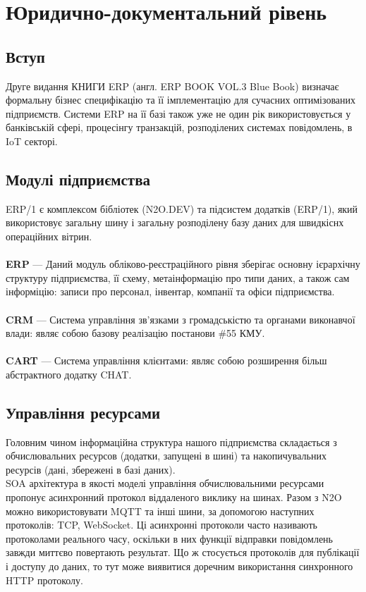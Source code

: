 \chapter{Юридично-документальний рівень}

\section{Вступ}

Друге видання КНИГИ ERP (англ. ERP BOOK VOL.3 Blue Book) визначає формальну
бізнес специфікацію та її імплементацію для сучасних оптимізованих підприємств.
Системи ERP на її базі також уже не один рік використовується у банківській сфері,
процесінгу транзакцій, розподілених системах повідомлень, в IoT секторі.

\section{Модулі підприємства}

ERP/1 є комплексом бібліотек (N2O.DEV) та підсистем додатків (ERP/1),
який використовує загальну шину і загальну розподілену базу даних для швидкіснх операційних вітрин.
\\
\\
\textbf{ERP} — Даний модуль обліково-реєстраційного рівня зберігає основну ієрархічну структуру
        підприємства, її схему, метаінформацію про типи даних, а також сам інформіцію:
        записи про персонал, інвентар, компанії та офіси підприємства.
\\
\\
\textbf{CRM} — Система управління зв'язками з громадськістю та органами виконавчої влади:
        являє собою базову реалізацію постанови \#55 КМУ.
\\
\\
\textbf{CART} — Система управління клієнтами: являє собою розширення більш
           абстрактного додатку CHAT.

\newpage
\section{Управління ресурсами}

Головним чином інформаційна структура нашого підприємства
складається з обчислювальних ресурсов (додатки, запущені в шині)
та накопичувальних ресурсів (дані, збережені в базі даних).
\
\\
SOA архітектура в якості моделі управління обчислювальними
ресурсами пропонує асинхронний протокол віддаленого виклику на шинах.
Разом з N2O можно використовувати MQTT та інші шини, за допомогою наступних протоколів: TCP, WebSocket.
Ці асинхронні протоколи часто називають
протоколами реального часу, оскільки в них функції відправки повідомлень завжди
миттєво повертають результат. Що ж стосується протоколів для публікації і доступу
до даних, то тут може виявитися доречним використання синхронного HTTP протоколу.

